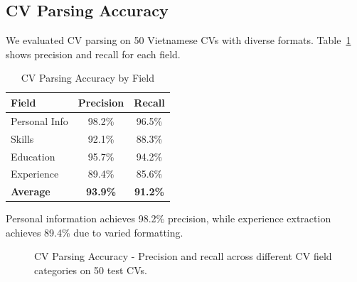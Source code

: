 \documentclass[conference]{IEEEtran}
\begin{document}
\subsection{CV Parsing Accuracy}

We evaluated CV parsing on 50 Vietnamese CVs with diverse formats. Table~\ref{tab1} shows precision and recall for each field.

\begin{table}[htbp]
\caption{CV Parsing Accuracy by Field}
\begin{center}
\begin{tabular}{|l|c|c|}
\hline
\textbf{Field} & \textbf{Precision} & \textbf{Recall} \\
\hline
Personal Info & 98.2\% & 96.5\% \\
Skills & 92.1\% & 88.3\% \\
Education & 95.7\% & 94.2\% \\
Experience & 89.4\% & 85.6\% \\
\hline
\textbf{Average} & \textbf{93.9\%} & \textbf{91.2\%} \\
\hline
\end{tabular}
\label{tab1}
\end{center}
\end{table}

Personal information achieves 98.2\% precision, while experience extraction achieves 89.4\% due to varied formatting.

\begin{figure}[htbp]
\centering
{}
\caption{CV Parsing Accuracy - Precision and recall across different CV field categories on 50 test CVs.}
\label{fig:parsing_accuracy}
\end{figure}
\end{document}
